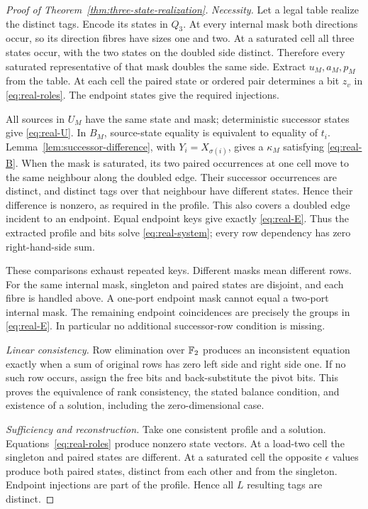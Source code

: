 \begin{proof}[Proof of Theorem~\ref{thm:three-state-realization}]
\emph{Necessity.}
Let a legal table realize the distinct tags. Encode its states in $Q_3$.
At every internal mask both directions occur, so its direction fibres have sizes
one and two. At a saturated cell all three states occur, with the two states on the
doubled side distinct. Therefore every saturated representative of that mask doubles
the same side. Extract $u_M,a_M,p_M$ from the table. At each cell the paired state
or ordered pair determines a bit $z_v$ in \eqref{eq:real-roles}. The endpoint states
give the required injections.

All sources in $U_M$ have the same state and mask; deterministic successor states
give \eqref{eq:real-U}. In $B_M$, source-state equality is equivalent to equality
of $t_i$. Lemma~\ref{lem:successor-difference}, with $Y_i=X_{\sigma(i)}$,
gives a $\kappa_M$ satisfying \eqref{eq:real-B}.
When the mask is saturated, its two paired occurrences at one cell move to the
same neighbour along the doubled edge. Their successor occurrences are distinct,
and distinct tags over that neighbour have different states. Hence their difference
is nonzero, as required in the profile. This also covers a doubled edge incident to
an endpoint. Equal endpoint keys give exactly \eqref{eq:real-E}.
Thus the extracted profile and bits solve \eqref{eq:real-system}; every row
dependency has zero right-hand-side sum.

These comparisons exhaust repeated keys. Different masks mean different rows.
For the same internal mask, singleton and paired states are disjoint, and each
fibre is handled above. A one-port endpoint mask cannot equal a two-port internal
mask. The remaining endpoint coincidences are precisely the groups in
\eqref{eq:real-E}. In particular no additional successor-row condition is missing.

\emph{Linear consistency.}
Row elimination over $\mathbb F_2$ produces an inconsistent equation exactly when a sum
of original rows has zero left side and right side one. If no such row occurs,
assign the free bits and back-substitute the pivot bits. This proves the equivalence
of rank consistency, the stated balance condition, and existence of a solution,
including the zero-dimensional case.

\emph{Sufficiency and reconstruction.}
Take one consistent profile and a solution. Equations~\eqref{eq:real-roles}
produce nonzero state vectors. At a load-two cell the singleton and paired states
are different. At a saturated cell the opposite $\epsilon$ values produce both
paired states, distinct from each other and from the singleton. Endpoint injections
are part of the profile. Hence all $L$ resulting tags are distinct.


\end{proof}
